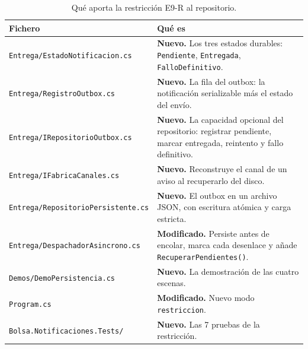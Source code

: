 \begin{table}[H]
\centering
\small
\begin{tabularx}{\textwidth}{>{\raggedright\arraybackslash}p{6.4cm} >{\raggedright\arraybackslash}X}
\toprule
\textbf{Fichero} & \textbf{Qué es} \\
\midrule
\texttt{Entrega/EstadoNotificacion.cs} & \textbf{Nuevo.} Los tres estados durables: \texttt{Pendiente}, \texttt{Entregada}, \texttt{FalloDefinitivo}. \\
\texttt{Entrega/RegistroOutbox.cs} & \textbf{Nuevo.} La fila del outbox: la notificación serializable más el estado del envío. \\
\texttt{Entrega/IRepositorioOutbox.cs} & \textbf{Nuevo.} La capacidad opcional del repositorio: registrar pendiente, marcar entregada, reintento y fallo definitivo. \\
\texttt{Entrega/IFabricaCanales.cs} & \textbf{Nuevo.} Reconstruye el canal de un aviso al recuperarlo del disco. \\
\texttt{Entrega/RepositorioPersistente.cs} & \textbf{Nuevo.} El outbox en un archivo JSON, con escritura atómica y carga estricta. \\
\texttt{Entrega/DespachadorAsincrono.cs} & \textbf{Modificado.} Persiste antes de encolar, marca cada desenlace y añade \texttt{RecuperarPendientes()}. \\
\texttt{Demos/DemoPersistencia.cs} & \textbf{Nuevo.} La demostración de las cuatro escenas. \\
\texttt{Program.cs} & \textbf{Modificado.} Nuevo modo \texttt{restriccion}. \\
\texttt{Bolsa.Notificaciones.Tests/} & \textbf{Nuevo.} Las 7 pruebas de la restricción. \\
\bottomrule
\end{tabularx}
\caption{Qué aporta la restricción E9-R al repositorio.}
\end{table}
